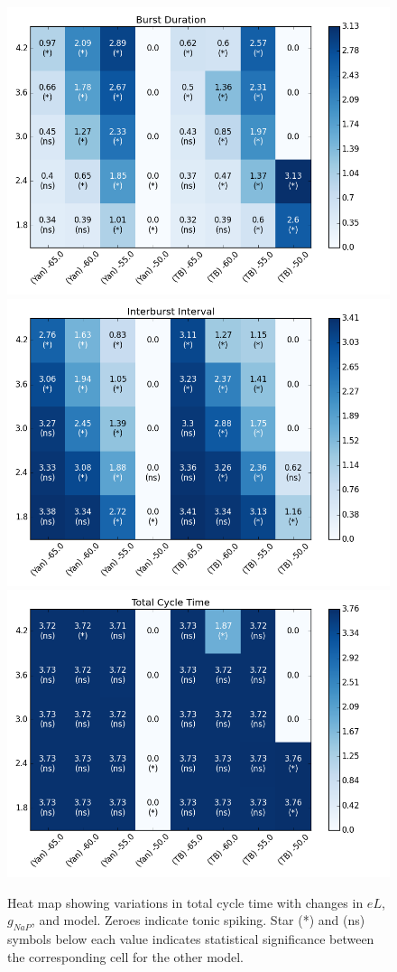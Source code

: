 \documentclass[11pt]{article}
\begin{document}
\begin{figure}[h]
	\centering
	\includegraphics[scale=.4]{heatmap_Burst_Duration.png}
	\includegraphics[scale=.4]{heatmap_Interburst_Interval.png}
	\includegraphics[scale=.4]{heatmap_Total_Cycle_Time.png}
	\caption{Heat map showing variations in total cycle time with changes in $eL$, $g_{NaP}$, and model. Zeroes indicate tonic spiking. Star (*) and (ns) symbols below each value indicates statistical significance between the corresponding cell for the other model.}
	\label{fig:hmTCT}
\end{figure}
\end{document}
